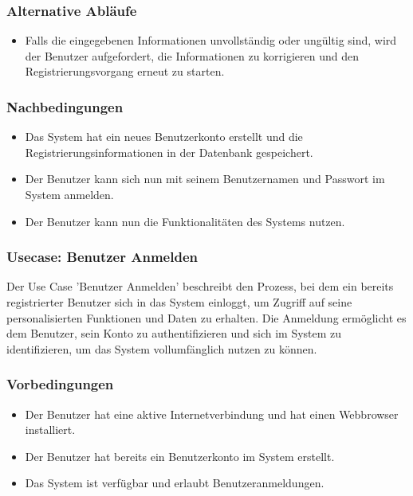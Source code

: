 \subsubsection*{Alternative Abläufe}

\begin{itemize}
  \item Falls die eingegebenen Informationen unvollständig oder ungültig sind, wird der Benutzer aufgefordert, die Informationen zu korrigieren
   und den Registrierungsvorgang erneut zu starten.
\end{itemize}

\subsubsection*{Nachbedingungen}

\begin{itemize}
  \item Das System hat ein neues Benutzerkonto erstellt und die Registrierungsinformationen in der Datenbank gespeichert.
  \item Der Benutzer kann sich nun mit seinem Benutzernamen und Passwort im System anmelden.
  \item Der Benutzer kann nun die Funktionalitäten des Systems nutzen.
\end{itemize}

\subsubsection{Usecase: Benutzer Anmelden}

Der Use Case 'Benutzer Anmelden' beschreibt den Prozess, bei dem ein bereits registrierter Benutzer sich in das System einloggt,
um Zugriff auf seine personalisierten Funktionen und Daten zu erhalten. Die Anmeldung ermöglicht es dem Benutzer, 
sein Konto zu authentifizieren und sich im System zu identifizieren, um das System vollumfänglich nutzen zu können.

\subsubsection*{Vorbedingungen}

\begin{itemize}
  \item Der Benutzer hat eine aktive Internetverbindung und hat einen Webbrowser installiert.
  \item Der Benutzer hat bereits ein Benutzerkonto im System erstellt.
  \item Das System ist verfügbar und erlaubt Benutzeranmeldungen.
\end{itemize}

